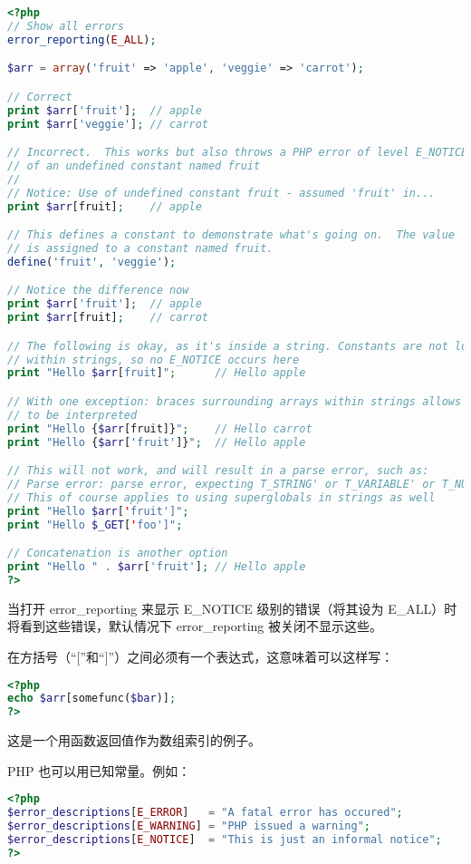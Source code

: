 \begin{lstlisting}[language=PHP]
<?php
// Show all errors
error_reporting(E_ALL);

$arr = array('fruit' => 'apple', 'veggie' => 'carrot');

// Correct
print $arr['fruit'];  // apple
print $arr['veggie']; // carrot

// Incorrect.  This works but also throws a PHP error of level E_NOTICE because
// of an undefined constant named fruit
// 
// Notice: Use of undefined constant fruit - assumed 'fruit' in...
print $arr[fruit];    // apple

// This defines a constant to demonstrate what's going on.  The value 'veggie'
// is assigned to a constant named fruit.
define('fruit', 'veggie');

// Notice the difference now
print $arr['fruit'];  // apple
print $arr[fruit];    // carrot

// The following is okay, as it's inside a string. Constants are not looked for
// within strings, so no E_NOTICE occurs here
print "Hello $arr[fruit]";      // Hello apple

// With one exception: braces surrounding arrays within strings allows constants
// to be interpreted
print "Hello {$arr[fruit]}";    // Hello carrot
print "Hello {$arr['fruit']}";  // Hello apple

// This will not work, and will result in a parse error, such as:
// Parse error: parse error, expecting T_STRING' or T_VARIABLE' or T_NUM_STRING'
// This of course applies to using superglobals in strings as well
print "Hello $arr['fruit']";
print "Hello $_GET['foo']";

// Concatenation is another option
print "Hello " . $arr['fruit']; // Hello apple
?>
\end{lstlisting}

当打开 error\_reporting 来显示 E\_NOTICE 级别的错误（将其设为 E\_ALL）时将看到这些错误，默认情况下 error\_reporting 被关闭不显示这些。

在方括号（“[”和“]”）之间必须有一个表达式，这意味着可以这样写：


\begin{lstlisting}[language=PHP]
<?php
echo $arr[somefunc($bar)];
?>
\end{lstlisting}


这是一个用函数返回值作为数组索引的例子。

PHP 也可以用已知常量。例如：

\begin{lstlisting}[language=PHP]
<?php
$error_descriptions[E_ERROR]   = "A fatal error has occured";
$error_descriptions[E_WARNING] = "PHP issued a warning";
$error_descriptions[E_NOTICE]  = "This is just an informal notice";
?>
\end{lstlisting}

